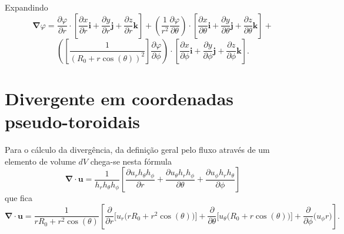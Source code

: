 \documentclass[12pt,oneside,a4paper]{abntex2}
\begin{document}
Expandindo
\begin{equation}
\bm{\nabla} \varphi = \dfrac{\partial \varphi}{\partial r} \cdot \left[ \dfrac{\partial x}{\partial r}\bm{i} + \dfrac{\partial y}{\partial r}\bm{j} + \dfrac{\partial z}{\partial r}\bm{k}\right] + \left(\frac{1}{r^2}\dfrac{\partial \varphi}{\partial \theta} \right) \cdot \left[\dfrac{\partial x}{\partial \theta}\bm{i} + \dfrac{\partial y}{\partial \theta}\bm{j} + \dfrac{\partial z}{\partial \theta}\bm{k}  \right] + 
\end{equation}
\begin{equation*}
\left( \left[ \frac{1}{ (R_0 + r \cos(\theta))^2}\right] \dfrac{\partial \varphi}{\partial \phi}\right) \cdot \left[ \dfrac{\partial x}{\partial \phi}\bm{i} + \dfrac{\partial y}{\partial \phi}\bm{j} + \dfrac{\partial z}{\partial \phi}\bm{k} \right].
\end{equation*}

\section{Divergente em coordenadas pseudo-toroidais}
\noindent Para o cálculo da divergência, da definição geral pelo fluxo através de um elemento de volume $dV$ chega-se nesta fórmula
\begin{equation}
\bm{\nabla} \cdot \bm{u} = \frac{1}{h_r h_\theta h_\phi} \left[ \dfrac{\partial u_r h_\theta h_\phi}{\partial r} + \dfrac{\partial u_\theta h_r h_\phi}{\partial \theta} +  \dfrac{\partial u_\phi h_r h_\theta}{\partial \phi} \right]
\end{equation}
que fica
\begin{equation}
\bm{\nabla} \cdot \bm{u} = \frac{1}{r R_0 + r^2 \cos(\theta)} \left[ \dfrac{\partial}{\partial r} \Big[u_r \big(r R_0 + r^2 \cos(\theta)\big)\Big] + \dfrac{\partial}{\partial \theta}\Big[ u_\theta \big( R_0 + r \cos(\theta) \big) \Big] +  \dfrac{\partial }{\partial \phi}\big( u_\phi  r \big) \right].
\end{equation}
\end{document}
